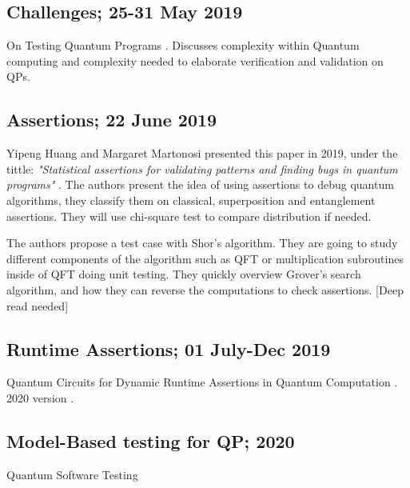 \begin{itemize}
\subsection{Challenges; 25-31 May 2019}
On Testing Quantum Programs \cite{miranskyy2019testing}. Discusses complexity within Quantum computing and complexity needed to elaborate verification and validation on QPs.

\vspace{15pt}
\subsection{Assertions; 22 June 2019}
Yipeng Huang and Margaret Martonosi presented this paper in 2019, under the tittle: \textit{"Statistical assertions for validating patterns and finding bugs in quantum programs"} \cite{huang2019statistical}. The authors present the idea of using assertions to debug quantum algorithms, they classify them on classical, superposition and entanglement assertions. They will use chi-square test to compare distribution if needed.\newline

The authors propose a test case with Shor's algorithm. They are going to study different components of the algorithm such as QFT or multiplication subroutines inside of QFT doing unit testing. They quickly overview Grover's search algorithm, and how they can reverse the computations to check assertions. [Deep read needed]

\vspace{15pt}
\subsection{Runtime Assertions; 01 July-Dec 2019}
Quantum Circuits for Dynamic Runtime Assertions in Quantum Computation \cite{zhou2019quantum}. 2020 version \cite{liu2020quantum}.

\vspace{15pt}
\subsection{Model-Based testing for QP; 2020}
Quantum Software Testing \cite{usaola2020quantum}

\vspace{15pt}

\end{itemize}
